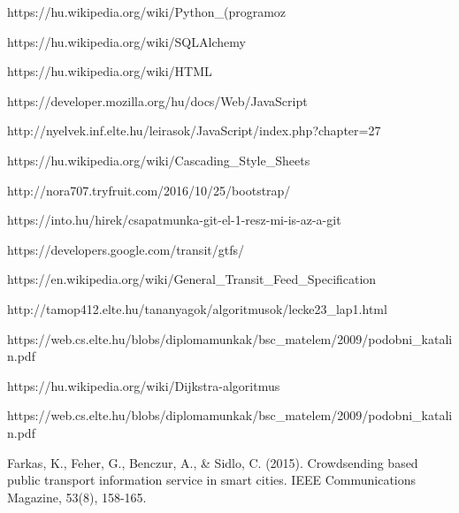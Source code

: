 \begin{thebibliography}{x}

 https://hu.wikipedia.org/wiki/Python\_(programoz%


 https://hu.wikipedia.org/wiki/SQLAlchemy

 https://hu.wikipedia.org/wiki/HTML

 https://developer.mozilla.org/hu/docs/Web/JavaScript

 http://nyelvek.inf.elte.hu/leirasok/JavaScript/index.php?chapter=27

 https://hu.wikipedia.org/wiki/Cascading\_Style\_Sheets

 http://nora707.tryfruit.com/2016/10/25/bootstrap/

 https://into.hu/hirek/csapatmunka-git-el-1-resz-mi-is-az-a-git


https://developers.google.com/transit/gtfs/

https://en.wikipedia.org/wiki/General\_Transit\_Feed\_Specification

http://tamop412.elte.hu/tananyagok/algoritmusok/lecke23\_lap1.html

https://web.cs.elte.hu/blobs/diplomamunkak/bsc\_matelem/2009/podobni\_katalin.pdf

https://hu.wikipedia.org/wiki/Dijkstra-algoritmus

https://web.cs.elte.hu/blobs/diplomamunkak/bsc\_matelem/2009/podobni\_katalin.pdf

Farkas, K., Feher, G., Benczur, A., & Sidlo, C. (2015). Crowdsending based public transport information service in smart cities. IEEE Communications Magazine, 53(8), 158-165.

\end{thebibliography}
